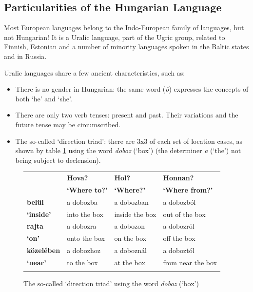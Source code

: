 \begin{multicols}{2}

  \subsection{Particularities of the Hungarian Language}

  Most European languages belong to the Indo-European family of languages, but not Hungarian! It is a Uralic language, part of the Ugric group, related to Finnish, Estonian and a number of minority languages spoken in the Baltic states and in Russia.

  Uralic languages share a few ancient characteristics, such as: 

  \begin{itemize}
  \item There is no gender in Hungarian: the same word (\textit{ő}) expresses the concepts of both `he' and `she'. 
  \item There are only two verb tenses: present and past. Their variations and the future tense may be circumscribed. 
  \item The so-called `direction triad': there are 3x3 of each set of location cases, as shown by table \ref{doboz_en} using the word \textit{doboz} (`box') (the determiner \textit{a} (`the') not being subject to declension).
  \end{itemize}

  \begin{figure}[htb]
    \setlength{\tabcolsep}{2em}
    \begin{tabularx}{\textwidth}{llll} \toprule\addlinespace
      \textbf{} & \textbf{Hova?} & \textbf{Hol?} & \textbf{Honnan?}\\
      \textbf{} & \textbf{`Where to?'} & \textbf{`Where?'} & \textbf{`Where from?'}\\
       \addlinespace\midrule\addlinespace
      \textbf{belül} & a dobozba & a dobozban & a dobozból\\
      \textbf{`inside'} & into the box & inside the box & out of the box\\
      \addlinespace\midrule\addlinespace
      \textbf{rajta} & a dobozra & a dobozon & a dobozról\\
      \textbf{`on'} & onto the box & on the box & off the box\\ 
      \addlinespace\midrule\addlinespace
      \textbf{közelében} & a dobozhoz & a doboznál & a doboztól\\
      \textbf{`near'} & to the box & at the box & from near the box\\ \addlinespace\bottomrule
    \end{tabularx}
    \caption{The so-called `direction triad' using the word \textit{doboz} (`box')}
    \label{doboz_en}
  \end{figure}


\end{multicols}
